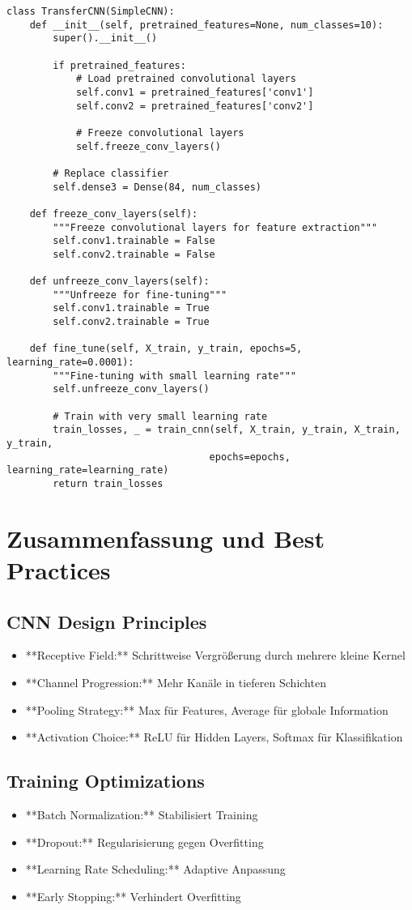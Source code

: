 ﻿\documentclass[12pt,a4paper]{article}
\begin{document}
\begin{lstlisting}
class TransferCNN(SimpleCNN):
    def __init__(self, pretrained_features=None, num_classes=10):
        super().__init__()
        
        if pretrained_features:
            # Load pretrained convolutional layers
            self.conv1 = pretrained_features['conv1']
            self.conv2 = pretrained_features['conv2']
            
            # Freeze convolutional layers
            self.freeze_conv_layers()
        
        # Replace classifier
        self.dense3 = Dense(84, num_classes)
    
    def freeze_conv_layers(self):
        """Freeze convolutional layers for feature extraction"""
        self.conv1.trainable = False
        self.conv2.trainable = False
    
    def unfreeze_conv_layers(self):
        """Unfreeze for fine-tuning"""
        self.conv1.trainable = True
        self.conv2.trainable = True
    
    def fine_tune(self, X_train, y_train, epochs=5, learning_rate=0.0001):
        """Fine-tuning with small learning rate"""
        self.unfreeze_conv_layers()
        
        # Train with very small learning rate
        train_losses, _ = train_cnn(self, X_train, y_train, X_train, y_train,
                                   epochs=epochs, learning_rate=learning_rate)
        return train_losses
\end{lstlisting}

\section*{Zusammenfassung und Best Practices}

\subsection*{CNN Design Principles}
\begin{itemize}
    \item **Receptive Field:** Schrittweise Vergrößerung durch mehrere kleine Kernel
    \item **Channel Progression:** Mehr Kanäle in tieferen Schichten
    \item **Pooling Strategy:** Max für Features, Average für globale Information
    \item **Activation Choice:** ReLU für Hidden Layers, Softmax für Klassifikation
\end{itemize}

\subsection*{Training Optimizations}
\begin{itemize}
    \item **Batch Normalization:** Stabilisiert Training
    \item **Dropout:** Regularisierung gegen Overfitting
    \item **Learning Rate Scheduling:** Adaptive Anpassung
    \item **Early Stopping:** Verhindert Overfitting
\end{itemize}
\end{document}
